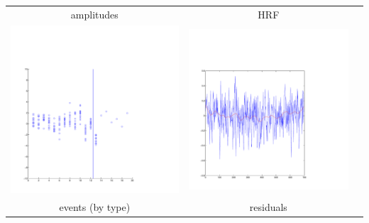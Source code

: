\documentclass{beamer}
\begin{document}
\begin{frame}
\begin{tabular}{ccc}
amplitudes & HRF\\
\includegraphics[scale=0.1]{ex2_data1c.pdf} & \includegraphics[scale=0.2]{ex2_data1r.pdf}\\
events (by type) & residuals
\end{tabular}
\end{frame}
\end{document}
